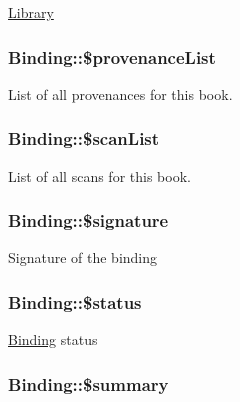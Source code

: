 \label{classBinding_a9e88a985a9d2097135f01ef49a1c3114}
\hyperlink{classLibrary}{Library} \hypertarget{classBinding_a9f4c618edbd6df5e1972aae7350e37d4}{
\subsubsection[{\$provenanceList}]{\setlength{\rightskip}{0pt plus 5cm}Binding::\$provenanceList}}
\label{classBinding_a9f4c618edbd6df5e1972aae7350e37d4}
List of all provenances for this book. \hypertarget{classBinding_a1ba6844e15978a1136a50632f30e29b6}{
\subsubsection[{\$scanList}]{\setlength{\rightskip}{0pt plus 5cm}Binding::\$scanList}}
\label{classBinding_a1ba6844e15978a1136a50632f30e29b6}
List of all scans for this book. \hypertarget{classBinding_a508680736126fbd926d7f6ba9aeed585}{
\subsubsection[{\$signature}]{\setlength{\rightskip}{0pt plus 5cm}Binding::\$signature}}
\label{classBinding_a508680736126fbd926d7f6ba9aeed585}
Signature of the binding \hypertarget{classBinding_a1320ef2d72d40ce811c675afc602929a}{
\subsubsection[{\$status}]{\setlength{\rightskip}{0pt plus 5cm}Binding::\$status}}
\label{classBinding_a1320ef2d72d40ce811c675afc602929a}
\hyperlink{classBinding}{Binding} status \hypertarget{classBinding_ae960edd7ba2a427c3853936f0e1a380e}{
\subsubsection[{\$summary}]{\setlength{\rightskip}{0pt plus 5cm}Binding::\$summary}}
